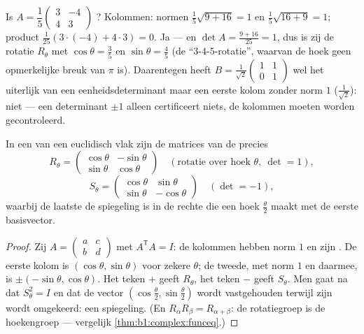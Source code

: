 \begin{example}
\label{ex:b1:euclid:recognize}
Is $A = \dfrac15\begin{pmatrix} 3 & -4\\ 4 & 3\end{pmatrix}$
? Kolommen: normen $\frac15\sqrt{9 + 16} = 1$ en
$\frac15\sqrt{16 + 9} = 1$; product $\frac1{25}(3\cdot(-4) +
4\cdot3) = 0$. Ja --- en $\det A = \frac{9 + 16}{25} = 1$, dus is
zij de rotatie $R_\theta$ met $\cos\theta = \frac35$ en
$\sin\theta = \frac45$ (de ``$3$-$4$-$5$-rotatie'', waarvan de
hoek geen opmerkelijke breuk van $\pi$ is). Daarentegen heeft $B =
\frac{1}{\sqrt2}\begin{pmatrix} 1 & 1\\ 0 & 1\end{pmatrix}$ wel
het uiterlijk van een eenheidsdeterminant maar een eerste kolom
zonder norm $1$ ($\frac1{\sqrt2}$): niet  --- een
determinant $\pm1$ alleen certificeert niets, de kolommen moeten
worden gecontroleerd.
\end{example}

\begin{theorem}\label{thm:b1:euclid:plane}
In een   van een euclidisch vlak zijn de matrices
van de  precies
\[
R_\theta = \begin{pmatrix}
\cos\theta & -\sin\theta\\ \sin\theta & \cos\theta
\end{pmatrix}
\quad (\text{rotatie over hoek } \theta,\ \det = 1),
\]
\[
S_\theta = \begin{pmatrix}
\cos\theta & \sin\theta\\ \sin\theta & -\cos\theta
\end{pmatrix}
\quad (\det = -1),
\]
waarbij de laatste de spiegeling is in de rechte die een hoek
$\frac\theta2$ maakt met de eerste basisvector.
\end{theorem}

\begin{proof}
Zij $A = \begin{pmatrix} a & c\\ b & d\end{pmatrix}$ met $A^{\mathsf
T}A = I$: de kolommen hebben norm $1$ en zijn . De eerste
kolom is $(\cos\theta, \sin\theta)$ voor zekere $\theta$; de tweede,
met norm $1$ en  daarmee, is $\pm(-\sin\theta,
\cos\theta)$. Het teken $+$ geeft $R_\theta$, het teken $-$ geeft
$S_\theta$. Men gaat na dat $S_\theta^2 = I$ en dat de vector
$(\cos\frac\theta2, \sin\frac\theta2)$ wordt vastgehouden terwijl
zijn  wordt omgekeerd: een spiegeling. (En $R_\alpha
R_\beta = R_{\alpha+\beta}$: de rotatiegroep is de hoekengroep ---
vergelijk \cref{thm:b1:complex:funceq}.)
\end{proof}

